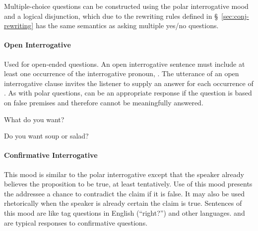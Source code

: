 
Multiple-choice questions can be constructed using the polar interrogative mood
and a logical disjunction, which due to the rewriting rules defined in
\S~\ref{sec:conj-rewriting} has the same semantics as asking multiple yes/no
questions.

\paragraph{Open Interrogative} Used for open-ended questions. An open
interrogative sentence must include at least one occurrence of the interrogative
pronoun, . The utterance of an open interrogative clause invites the
listener to supply an answer for each occurrence of . As with polar
questions,  can be an appropriate response if the question is based
on false premises and therefore cannot be meaningfully answered.

{What do you want?}
{}

{Do you want soup or salad?}
{}

\paragraph{Confirmative Interrogative} This mood is similar to the polar
interrogative except that the speaker already believes the proposition to be
true, at least tentatively. Use of this mood presents the addressee a chance to
contradict the claim if it is false. It may also be used rhetorically when the
speaker is already certain the claim is true. Sentences of this mood are like
tag questions in English (``right?'') and other languages.  and
 are typical responses to confirmative questions.

